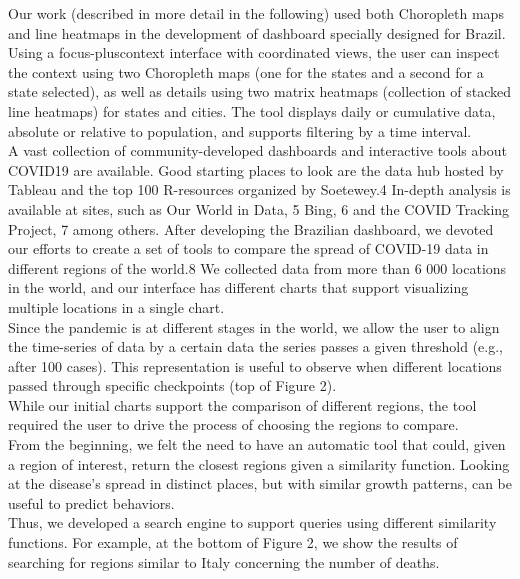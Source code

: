 Our work (described in more detail in the following) used both Choropleth maps and line heatmaps in the development of dashboard specially designed for Brazil. Using a focus-pluscontext interface with coordinated views, the user can inspect the context using two Choropleth maps (one for the states and a second for a state selected), as well as details using two matrix heatmaps (collection of stacked line heatmaps) for states and cities. The tool displays daily or cumulative data, absolute or relative to population, and supports filtering by a time interval.\\

A vast collection of community-developed dashboards and interactive tools about COVID19 are available. Good starting places to look are the data hub hosted by Tableau and the top 100 R-resources organized by Soetewey.4 In-depth analysis is available at sites, such as Our World in Data, 5 Bing, 6 and the COVID Tracking Project, 7 among others. After developing the Brazilian dashboard, we devoted our efforts to create a set of tools to compare the spread of COVID-19 data in different regions of the world.8 We collected data from more than 6 000 locations in the world, and our interface has different charts that support visualizing multiple locations in a single chart.\\

Since the pandemic is at different stages in the world, we allow the user to align the time-series of data by a certain data the series passes a given threshold (e.g., after 100 cases). This representation is useful to observe when different locations passed through specific checkpoints (top of Figure 2).\\

While our initial charts support the comparison of different regions, the tool required the user to drive the process of choosing the regions to compare.\\

From the beginning, we felt the need to have an automatic tool that could, given a region of interest, return the closest regions given a similarity function. Looking at the disease’s spread in distinct places, but with similar growth patterns, can be useful to predict behaviors.\\

Thus, we developed a search engine to support queries using different similarity functions. For example, at the bottom of Figure 2, we show the results of searching for regions similar to Italy concerning the number of deaths.\\

